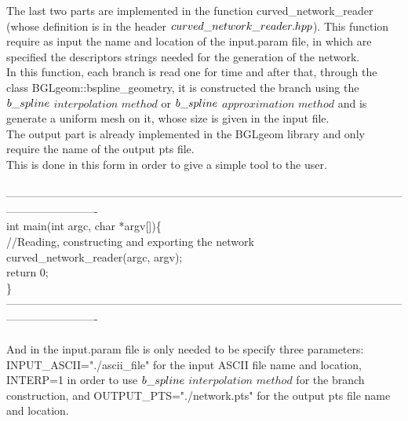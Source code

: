\documentclass[a4paper]{report}
\newcommand\tab[1][1cm]{\hspace*{#1}}
\begin{document}
The last two parts are implemented in the function  {\selectfont curved\_\-network\_\-reader} (whose definition is in the header $curved\_\-network\_\-reader.hpp$). This function require as input the name and location of the {\selectfont input.param} file, in which are specified the descriptors strings needed for the generation of the network.\\
In this function, each branch is read one for time and after that, through the  class  {\selectfont BGLgeom::bspline\_\-geometry}, it is constructed the branch using the $b\_\-spline$ $interpolation$ $method$ or $b\_\-spline$ $approximation$ $method$ and  is generate a uniform mesh on it, whose size is given in the input file.\\
The output part is already implemented in the  {\selectfont BGLgeom} library and only require the name of the output pts file.\\
This is done in this form in order to give a simple tool to the user.\\	
\\ -------------------------------------------------------------------------------------------------------------------------------------\\ 
{\selectfont 
int main(int argc, char *argv[])\{\\
\tab //Reading, constructing and exporting the network\\
\tab curved\_\-network\_\-reader(argc, argv);\\
\tab return 0;\\
\}
}
\\ -------------------------------------------------------------------------------------------------------------------------------------\\ \\
And in the {\selectfont input.param} file is only needed to be specify three parameters: {\selectfont INPUT\_\-ASCII="./ascii\_\-file"} for the input ASCII file name and location, {\selectfont  INTERP=1} in order to use $b\_\-spline$ $interpolation$ $method$ for the branch construction, and {\selectfont OUTPUT\_\-PTS="./network.pts"} for the output pts file name and location.
\end{document}
